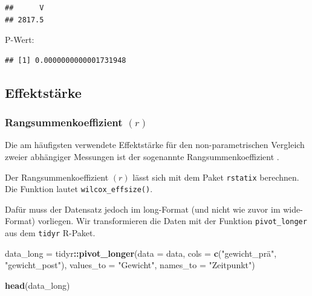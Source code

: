 \documentclass[
]{book}
\newenvironment{Shaded}{\begin{snugshade}}{\end{snugshade}}
\newcommand{\AttributeTok}[1]{\textcolor[rgb]{0.13,0.29,0.53}{#1}}
\newcommand{\FunctionTok}[1]{\textcolor[rgb]{0.13,0.29,0.53}{\textbf{#1}}}
\newcommand{\NormalTok}[1]{#1}
\newcommand{\OtherTok}[1]{\textcolor[rgb]{0.56,0.35,0.01}{#1}}
\newcommand{\SpecialCharTok}[1]{\textcolor[rgb]{0.81,0.36,0.00}{\textbf{#1}}}
\newcommand{\StringTok}[1]{\textcolor[rgb]{0.31,0.60,0.02}{#1}}
\begin{document}
\begin{verbatim}
##      V 
## 2817.5
\end{verbatim}

P-Wert:

\begin{Shaded}
\end{Shaded}

\begin{verbatim}
## [1] 0.0000000000001731948
\end{verbatim}

\subsection{Effektstärke}\label{effektstuxe4rke-4}

\subsubsection{\texorpdfstring{Rangsummenkoeffizient \((r)\)}{Rangsummenkoeffizient (r)}}\label{rangsummenkoeffizient-r-1}

Die am häufigsten verwendete Effektstärke für den non-parametrischen Vergleich zweier abhängiger Messungen ist der sogenannte Rangsummenkoeffizient \citet{tomczak2014need}.

Der Rangsummenkoeffizient \((r)\) lässt sich mit dem Paket \texttt{rstatix} berechnen. Die Funktion lautet \texttt{wilcox\_effsize()}.

Dafür muss der Datensatz jedoch im long-Format (und nicht wie zuvor im wide-Format) vorliegen. Wir transformieren die Daten mit der Funktion \texttt{pivot\_longer} aus dem \texttt{tidyr} R-Paket.

\begin{Shaded}
\begin{Highlighting}[]
\NormalTok{data\_long }\OtherTok{=}\NormalTok{ tidyr}\SpecialCharTok{::}\FunctionTok{pivot\_longer}\NormalTok{(}\AttributeTok{data =}\NormalTok{ data, }
                                \AttributeTok{cols =} \FunctionTok{c}\NormalTok{(}\StringTok{"gewicht\_prä"}\NormalTok{, }\StringTok{"gewicht\_post"}\NormalTok{), }
                                \AttributeTok{values\_to =} \StringTok{"Gewicht"}\NormalTok{,}
                                \AttributeTok{names\_to =} \StringTok{"Zeitpunkt"}\NormalTok{)}

\FunctionTok{head}\NormalTok{(data\_long)}
\end{Highlighting}
\end{Shaded}
\end{document}
